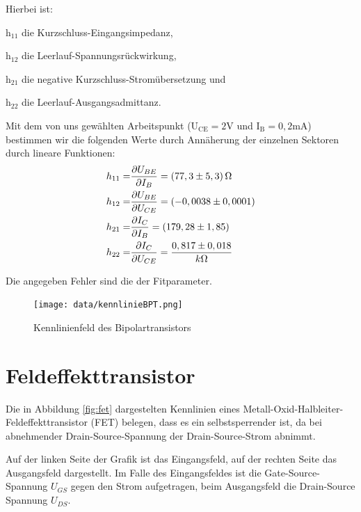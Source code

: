 Hierbei ist:
\begin{description}
\item{h$_{11}$} die Kurzschluss-Eingangsimpedanz,
\item{h$_{12}$} die Leerlauf-Spannungsrückwirkung,
\item{h$_{21}$} die negative Kurzschluss-Stromübersetzung und 
\item{h$_{22}$} die Leerlauf-Ausgangsadmittanz.
\end{description}
Mit dem von uns gewählten Arbeitspunkt ($\text{U}_\text{CE} = 2$V und $\text{I}_\text{B}=0,2$mA) bestimmen wir die folgenden Werte durch Annäherung der einzelnen Sektoren durch lineare Funktionen:
\begin{align}
h_{11}=&\frac{\partial U_{BE}}{\partial I_B}=(77,3\pm5,3)\,\Omega\notag\\
h_{12}=&\frac{\partial U_{BE}}{\partial U_{CE}}=(-0,0038\pm0,0001)\notag\\
h_{21}=&\frac{\partial I_C}{\partial I_B}=(179,28\pm1,85)\notag\\
h_{22}=&\frac{\partial I_C}{\partial U_{CE}}=\frac{0,817\pm0,018}{k\Omega}\notag
\end{align}


Die angegeben Fehler sind die der Fitparameter.
\begin{figure}[t]
    \centering
    \texttt{[image: data/kennlinieBPT.png]}
    \caption{Kennlinienfeld des Bipolartransistors}
    \label{fig:bpt}
\end{figure}


\section{Feldeffekttransistor}

Die in Abbildung \ref{fig:fet} dargestelten Kennlinien eines Metall-Oxid-Halbleiter-Feldeffekttransistor (FET) belegen, dass es ein selbstsperrender ist, da bei abnehmender Drain-Source-Spannung der Drain-Source-Strom abnimmt.

Auf der linken Seite der Grafik ist das Eingangsfeld, auf der rechten Seite das Ausgangsfeld dargestellt. Im Falle des Eingangsfeldes ist die Gate-Source-Spannung $U_{GS}$ gegen den Strom aufgetragen, beim Ausgangsfeld die Drain-Source Spannung $U_{DS}$.


